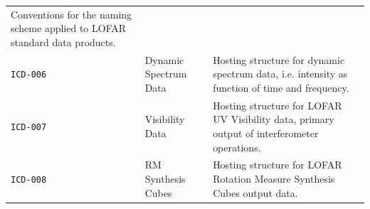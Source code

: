 \begin{center}
\begin{supertabular}{lp{5.8cm}p{7cm}}
    Conventions for the naming scheme applied to LOFAR standard data products. \\
    \texttt{ICD-006} \cite{lofar.icd.006} & Dynamic Spectrum Data &
    Hosting structure for dynamic spectrum data, i.e. intensity as
    function of time and frequency. \\
    \texttt{ICD-007} \cite{lofar.icd.007} & Visibility Data & Hosting structure for
    LOFAR UV Visibility data, primary output of interferometer operations. \\
    \texttt{ICD-008} \cite{lofar.icd.008} & RM Synthesis Cubes &
    Hosting structure for LOFAR Rotation Measure Synthesis Cubes
    output data. \\
    \hline
  \end{supertabular}
\end{center}
